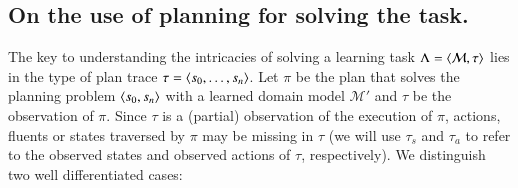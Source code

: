 \subsection{On the use of planning for solving the task.}

\textcolor[rgb]{1.00,0.00,0.00}{The key to understanding the intricacies of solving a learning task $\Lambda={\langle \mathcal{M},\tau \rangle}$ lies in the type of plan trace $\tau = {\langle s_0, \ldots, s_n \rangle}$. Let $\pi$ be the plan that solves the planning problem ${\langle s_0,s_n \rangle}$ with a learned domain model $\mathcal{M}'$ and $\tau$ be the observation of $\pi$. Since $\tau$ is a (partial) observation of the execution of $\pi$, actions, fluents or states traversed by $\pi$ may be missing in $\tau$ (we will use $\tau_s$ and $\tau_a$ to refer to the observed states and observed actions of $\tau$, respectively). We distinguish two well differentiated cases:}

